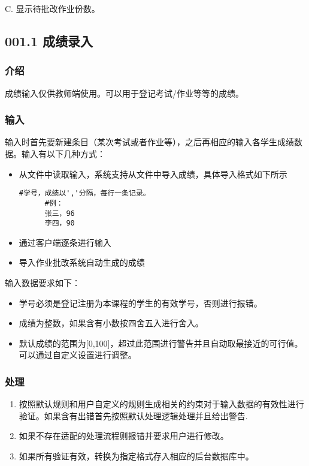 C. 显示待批改作业份数。

  \subsection{001.1 成绩录入}
    \subsubsection{介绍}
    成绩输入仅供教师端使用。可以用于登记考试/作业等等的成绩。
    \subsubsection{输入}
    输入时首先要新建条目（某次考试或者作业等），之后再相应的输入各学生成绩数据。输入有以下几种方式：
    \begin{itemize}
      \item 从文件中读取输入，系统支持从文件中导入成绩，具体导入格式如下所示
      \begin{lstlisting}[caption=文件导入成绩示例, label={code:import_grade_from_file}]
      #学号，成绩以','分隔，每行一条记录。
      #例：
      张三，96
      李四，90
      \end{lstlisting}
      \item 通过客户端逐条进行输入
      \item 导入作业批改系统自动生成的成绩
    \end{itemize}
    输入数据要求如下：
    \begin{itemize}
      \item 学号必须是登记注册为本课程的学生的有效学号，否则进行报错。
      \item 成绩为整数，如果含有小数按四舍五入进行舍入。
      \item 默认成绩的范围为[0,100]，超过此范围进行警告并且自动取最接近的可行值。可以通过自定义设置进行调整。
    \end{itemize}
    \subsubsection{处理}
    \begin{enumerate}
      \item 按照默认规则和用户自定义的规则生成相关的约束对于输入数据的有效性进行验证。如果含有出错首先按照默认处理逻辑处理并且给出警告.
      \item 如果不存在适配的处理流程则报错并要求用户进行修改。
      \item 如果所有验证有效，转换为指定格式存入相应的后台数据库中。
    \end{enumerate}
